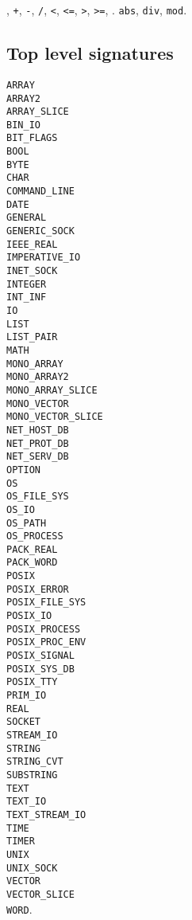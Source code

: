 %

{\tt *},
{\tt +},
{\tt -},
{\tt /},
{\tt <},
{\tt <=},
{\tt >},
{\tt >=},
{\tt {}}.
{\tt abs},
{\tt div},
{\tt mod}.
%
\newcommand{\signature}[1]{{\tt #1}\\}
\subsection{Top level signatures}
\signature{ARRAY}
\signature{ARRAY2}
\signature{ARRAY\_SLICE}
\signature{BIN\_IO}
\signature{BIT\_FLAGS}
\signature{BOOL}
\signature{BYTE}
\signature{CHAR}
\signature{COMMAND\_LINE}
\signature{DATE}
\signature{GENERAL}
\signature{GENERIC\_SOCK}
\signature{IEEE\_REAL}
\signature{IMPERATIVE\_IO}
\signature{INET\_SOCK}
\signature{INTEGER}
\signature{INT\_INF}
\signature{IO}
\signature{LIST}
\signature{LIST\_PAIR}
\signature{MATH}
\signature{MONO\_ARRAY}
\signature{MONO\_ARRAY2}
\signature{MONO\_ARRAY\_SLICE}
\signature{MONO\_VECTOR}
\signature{MONO\_VECTOR\_SLICE}
\signature{NET\_HOST\_DB}
\signature{NET\_PROT\_DB}
\signature{NET\_SERV\_DB}
\signature{OPTION}
\signature{OS}
\signature{OS\_FILE\_SYS}
\signature{OS\_IO}
\signature{OS\_PATH}
\signature{OS\_PROCESS}
\signature{PACK\_REAL}
\signature{PACK\_WORD}
\signature{POSIX}
\signature{POSIX\_ERROR}
\signature{POSIX\_FILE\_SYS}
\signature{POSIX\_IO}
\signature{POSIX\_PROCESS}
\signature{POSIX\_PROC\_ENV}
\signature{POSIX\_SIGNAL}
\signature{POSIX\_SYS\_DB}
\signature{POSIX\_TTY}
\signature{PRIM\_IO}
\signature{REAL}
\signature{SOCKET}
\signature{STREAM\_IO}
\signature{STRING}
\signature{STRING\_CVT}
\signature{SUBSTRING}
\signature{TEXT}
\signature{TEXT\_IO}
\signature{TEXT\_STREAM\_IO}
\signature{TIME}
\signature{TIMER}
\signature{UNIX}
\signature{UNIX\_SOCK}
\signature{VECTOR}
\signature{VECTOR\_SLICE}
{\tt WORD}.
%
\newcommand{\fullmodule}[2]{{\tt #1: #2}\\ }

